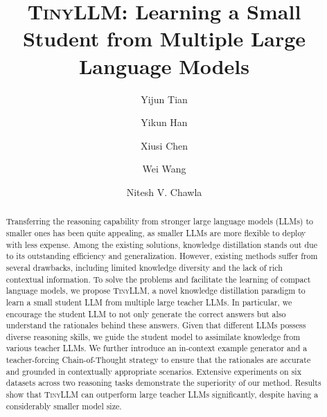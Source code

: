 \documentclass[sigconf,nonacm]{acmart}
\newcommand{\ours}{\textsc{TinyLLM}\xspace}
\begin{document}
\title{\ours: Learning a Small Student from Multiple Large Language Models}


\author{Yijun Tian}

\author{Yikun Han}
\authornotemark[1]

\author{Xiusi Chen}
\authornotemark[1]


\author{Wei Wang}


\author{Nitesh V. Chawla}


\begin{abstract}
  Transferring the reasoning capability from stronger large language models (LLMs) to smaller ones has been quite appealing, as smaller LLMs are more flexible to deploy with less expense. Among the existing solutions, knowledge distillation stands out due to its outstanding efficiency and generalization. However, existing methods suffer from several drawbacks, including limited knowledge diversity and the lack of rich contextual information. To solve the problems and facilitate the learning of compact language models, we propose \ours, a novel knowledge distillation paradigm to learn a small student LLM from multiple large teacher LLMs. In particular, we encourage the student LLM to not only generate the correct answers but also understand the rationales behind these answers. Given that different LLMs possess diverse reasoning skills, we guide the student model to assimilate knowledge from various teacher LLMs. We further introduce an in-context example generator and a teacher-forcing Chain-of-Thought strategy to ensure that the rationales are accurate and grounded in contextually appropriate scenarios. Extensive experiments on six datasets across two reasoning tasks demonstrate the superiority of our method. Results show that \ours can outperform large teacher LLMs significantly, despite having a considerably smaller model size.
\end{abstract}


\maketitle
\end{document}

